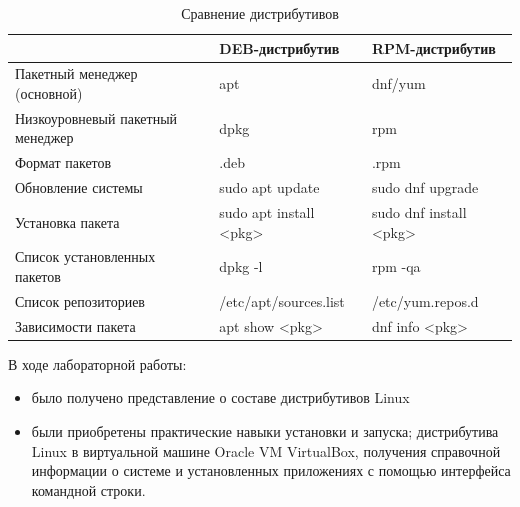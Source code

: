 \begin{table}[!htbp]
	\caption{Сравнение дистрибутивов}
	\begin{tabularx}{\textwidth}{|p{7cm}|X|X|}
		\hline
		& \textbf{DEB-дистрибутив} & \textbf{RPM-дистрибутив} \\\hline
		Пакетный менеджер (основной) & apt & dnf/yum \\\hline
		Низкоуровневый пакетный менеджер & dpkg & rpm\\\hline
		Формат пакетов & .deb & .rpm \\\hline
		Обновление системы & sudo apt update & sudo dnf upgrade\\\hline
		Установка пакета & sudo apt install <pkg> & sudo dnf install <pkg>\\\hline
		Список установленных пакетов & dpkg -l & rpm -qa\\\hline
		Список репозиториев & /etc/apt/sources.list & /etc/yum.repos.d\\\hline
		Зависимости пакета & apt show <pkg> & dnf info <pkg>\\\hline
	\end{tabularx}
\end{table}

%


В ходе лабораторной работы:
\begin{itemize}
	\item было получено представление о составе дистрибутивов Linux
	\item были приобретены практические навыки установки и запуска; дистрибутива Linux в виртуальной машине Oracle VM VirtualBox, получения справочной информации о системе и установленных приложениях с помощью интерфейса командной строки.
\end{itemize} 


